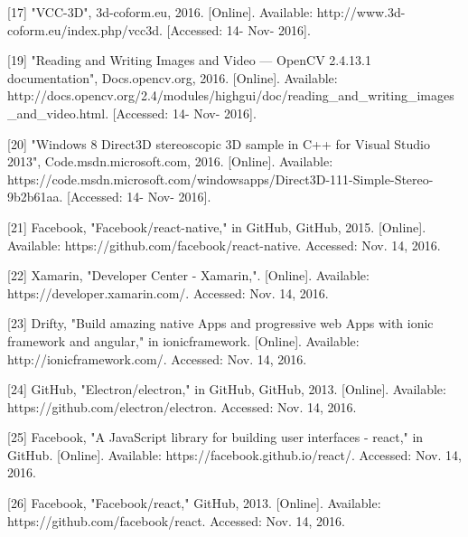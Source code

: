 \documentclass[10pt,draftclsnofoot,onecolumn]{IEEEtran}
\begin{document}
[17] "VCC-3D", 3d-coform.eu, 2016. [Online]. Available: http://www.3d-coform.eu/index.php/vcc3d. [Accessed: 14- Nov- 2016].\\
 \vspace{2mm}


[19] "Reading and Writing Images and Video — OpenCV 2.4.13.1 documentation", Docs.opencv.org, 2016. [Online]. Available: http://docs.opencv.org/2.4/modules/highgui/doc/reading_and_writing_images_and_video.html. [Accessed: 14- Nov- 2016].\\
 \vspace{2mm}


[20] "Windows 8 Direct3D stereoscopic 3D sample in C++ for Visual Studio 2013", Code.msdn.microsoft.com, 2016. [Online]. Available: https://code.msdn.microsoft.com/windowsapps/Direct3D-111-Simple-Stereo-9b2b61aa. [Accessed: 14- Nov- 2016].\\
 \vspace{2mm}


[21] Facebook, "Facebook/react-native," in GitHub, GitHub, 2015. [Online]. Available: https://github.com/facebook/react-native. Accessed: Nov. 14, 2016.\\
 \vspace{2mm}


[22] Xamarin, "Developer Center - Xamarin,". [Online]. Available: https://developer.xamarin.com/. Accessed: Nov. 14, 2016.\\
 \vspace{2mm}


[23] Drifty, "Build amazing native Apps and progressive web Apps with ionic framework and angular," in ionicframework. [Online]. Available: http://ionicframework.com/. Accessed: Nov. 14, 2016.\\
 \vspace{2mm}


[24] GitHub, "Electron/electron," in GitHub, GitHub, 2013. [Online]. Available: https://github.com/electron/electron. Accessed: Nov. 14, 2016.\\
 \vspace{2mm}


[25] Facebook, "A JavaScript library for building user interfaces - react," in GitHub. [Online]. Available: https://facebook.github.io/react/. Accessed: Nov. 14, 2016.\\
 \vspace{2mm}


[26] Facebook, "Facebook/react," GitHub, 2013. [Online]. Available: https://github.com/facebook/react. Accessed: Nov. 14, 2016.\\
 \vspace{2mm}
\end{document}
